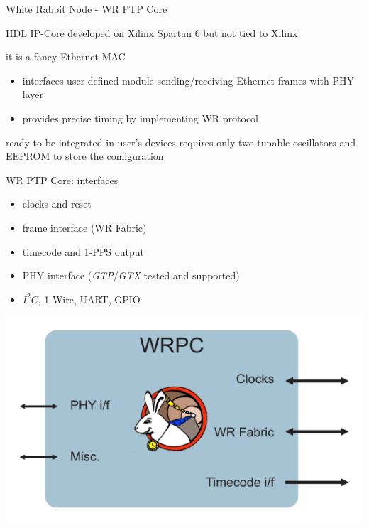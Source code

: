 \documentclass[compress,red]{beamer}
\begin{document}
\begin{frame}{White Rabbit Node - WR PTP Core}
	\begin{block}{HDL IP-Core}
	developed on Xilinx Spartan 6 but not tied to Xilinx
	\end{block}
	\begin{block}{it is a fancy Ethernet MAC}
	\begin{itemize}
	\item interfaces user-defined module sending/receiving Ethernet frames with PHY layer
	\item provides precise timing by implementing WR protocol
	\end{itemize}
	\end{block}
	\begin{block}{ready to be integrated in user's devices}
	requires only two tunable oscillators and EEPROM to store the configuration
	\end{block}
\end{frame}

\begin{frame}{WR PTP Core: interfaces}
	\begin{itemize}
		\item clocks and reset
		\item frame interface (WR Fabric)
		\item timecode and 1-PPS output
		\item PHY interface (\emph{GTP}/\emph{GTX} tested and supported)
		\item $I^2C$, 1-Wire, UART, GPIO
	\end{itemize}
	\begin{center}
		\includegraphics[width=.7\textwidth]{node/wrpc_overview.pdf}
	\end{center}
\end{frame}
\end{document}
